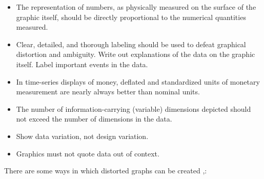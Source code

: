 \documentclass[]{book}
\providecommand{\tightlist}{%
  \setlength{\itemsep}{0pt}\setlength{\parskip}{0pt}}
\theoremstyle{definition}
\theoremstyle{definition}
\theoremstyle{definition}
\theoremstyle{remark}
\begin{document}
\begin{itemize}
\tightlist
\item
  The representation of numbers, as physically measured on the surface
  of the graphic itself, should be directly proportional to the
  numerical quantities measured.
\item
  Clear, detailed, and thorough labeling should be used to defeat
  graphical distortion and ambiguity. Write out explanations of the data
  on the graphic itself. Label important events in the data.
\item
  In time-series displays of money, deﬂated and standardized units of
  monetary measurement are nearly always better than nominal units.
\item
  The number of information-carrying (variable) dimensions depicted
  should not exceed the number of dimensions in the data.
\item
  Show data variation, not design variation.
\item
  Graphics must not quote data out of context.
\end{itemize}

There are some ways in which distorted graphs can be created
\citep{evil_axes},\citep{mislead_graph_ex}:
\end{document}
